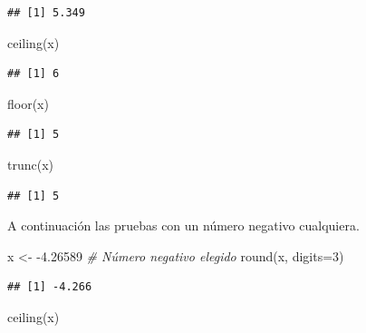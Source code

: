 \documentclass[
]{book}
\makeatletter
\newenvironment{Shaded}{\begin{snugshade}}{\end{snugshade}}
\newcommand{\AttributeTok}[1]{\textcolor[rgb]{0.77,0.63,0.00}{#1}}
\newcommand{\CommentTok}[1]{\textcolor[rgb]{0.56,0.35,0.01}{\textit{#1}}}
\newcommand{\DecValTok}[1]{\textcolor[rgb]{0.00,0.00,0.81}{#1}}
\newcommand{\FloatTok}[1]{\textcolor[rgb]{0.00,0.00,0.81}{#1}}
\newcommand{\FunctionTok}[1]{\textcolor[rgb]{0.00,0.00,0.00}{#1}}
\newcommand{\NormalTok}[1]{#1}
\newcommand{\OtherTok}[1]{\textcolor[rgb]{0.56,0.35,0.01}{#1}}
\newcommand{\SpecialCharTok}[1]{\textcolor[rgb]{0.00,0.00,0.00}{#1}}
\newenvironment{kframe}{%
\medskip{}
\setlength{\fboxsep}{.8em}
 \def\at@end@of@kframe{}%
 \ifinner\ifhmode%
  \def\at@end@of@kframe{\end{minipage}}%
  \begin{minipage}{\columnwidth}%
 \fi\fi%
 \def\FrameCommand##1{\hskip\@totalleftmargin \hskip-\fboxsep
 \colorbox{shadecolor}{##1}\hskip-\fboxsep
     \hskip-\linewidth \hskip-\@totalleftmargin \hskip\columnwidth}%
 \MakeFramed {\advance\hsize-\width
   \@totalleftmargin\z@ \linewidth\hsize
   \@setminipage}}%
 {\par\unskip\endMakeFramed%
 \at@end@of@kframe}
\renewenvironment{Shaded}{\begin{kframe}}{\end{kframe}}
\makeatother
\begin{document}
\begin{verbatim}
## [1] 5.349
\end{verbatim}

\begin{Shaded}
\begin{Highlighting}[]
\FunctionTok{ceiling}\NormalTok{(x)}
\end{Highlighting}
\end{Shaded}

\begin{verbatim}
## [1] 6
\end{verbatim}

\begin{Shaded}
\begin{Highlighting}[]
\FunctionTok{floor}\NormalTok{(x)}
\end{Highlighting}
\end{Shaded}

\begin{verbatim}
## [1] 5
\end{verbatim}

\begin{Shaded}
\begin{Highlighting}[]
\FunctionTok{trunc}\NormalTok{(x)}
\end{Highlighting}
\end{Shaded}

\begin{verbatim}
## [1] 5
\end{verbatim}

A continuación las pruebas con un número negativo cualquiera.

\begin{Shaded}
\begin{Highlighting}[]
\NormalTok{x }\OtherTok{\textless{}{-}} \SpecialCharTok{{-}}\FloatTok{4.26589}  \CommentTok{\# Número negativo elegido}
\FunctionTok{round}\NormalTok{(x, }\AttributeTok{digits=}\DecValTok{3}\NormalTok{)}
\end{Highlighting}
\end{Shaded}

\begin{verbatim}
## [1] -4.266
\end{verbatim}

\begin{Shaded}
\begin{Highlighting}[]
\FunctionTok{ceiling}\NormalTok{(x)}
\end{Highlighting}
\end{Shaded}
\end{document}

